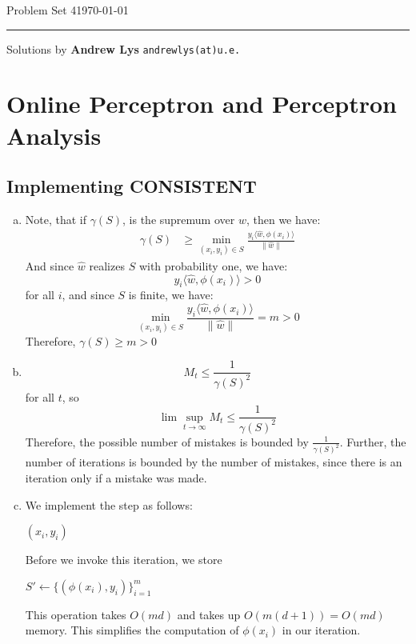 \documentclass{amsart}
\theoremstyle{definition}
\begin{document}
\noindent
Problem Set 4\hfill \today  %
\smallskip
\hrule
\smallskip
\noindent
Solutions by {\bf Andrew Lys} \qquad   %
  {\tt andrewlys(at)u.e.}      %

\vspace{0.5cm}
\section{Online Perceptron and Perceptron Analysis}
\subsection{Implementing CONSISTENT}
\begin{enumerate}[(a)]
  \item 
    Note, that if $\gamma(S)$, is the supremum over $w$, then we have:
    \begin{align*}
      \gamma(S) &\ge \min_{(x_i, y_i) \in S} \displaystyle\frac{y_i \langle \hat{w}, \phi(x_i)\rangle}{\|\hat{w}\|}
    \end{align*}
    And since $\hat{w}$ realizes $S$ with probability one, we have:
    \[
      y_i \langle \hat{w}, \phi(x_i) \rangle > 0
    \]
    for all $i$, and since $S$ is finite, we have:
    \[
      \min_{(x_i, y_i) \in S} \displaystyle\frac{y_i \langle \hat{w}, \phi(x_i)\rangle}{\|\hat{w}\|} = m > 0
    \]
    Therefore, $\gamma(S) \ge m > 0$
  \item 
    \[
      M_t \le \frac{1 }{\gamma(S)^2}
    \]
    for all $t$, so 
    \[
      \lim\sup_{t\to\infty} M_t \le \frac{1}{\gamma(S)^2}
    \]
    Therefore, the possible number of mistakes is bounded by $\frac{1}{\gamma(S)^2}$. Further, the number of iterations is bounded by the number of mistakes, since there is an iteration only if a mistake was made. 
  \item 
    We implement the step as follows: 
    \begin{algorithmic}[1]
          \State \Return $(x_i, y_i)$
        \EndIf
      \EndFor
    \end{algorithmic}
    Before we invoke this iteration, we store 
    \begin{algorithmic}
      \State $S' \gets \{(\phi(x_i), y_i)\}_{i = 1}^m$
    \end{algorithmic}
    This operation takes $O(md)$ and takes up $O(m(d+1))= O(md)$ memory. This simplifies the computation of $\phi(x_i)$ in our iteration. 


\end{enumerate}
\end{document}
